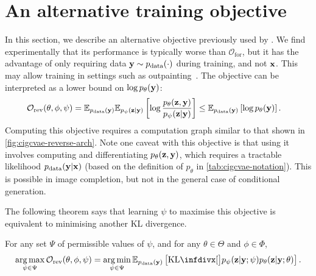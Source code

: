 \section{An alternative training objective}
\label{supp:cigcvae-ipa-r}
In this section, we describe an alternative objective previously used by
\citet{ma2018eddi}. We find experimentally that its performance is typically
worse than $\mathcal{O}_\mathrm{for}$, but it has the advantage of only
requiring data ${\mathbf{y}} \sim p_{\rm{data}} (\cdot)$ during training, and not ${\mathbf{x}}$.
This may allow training in settings such as
outpainting~\citep{sabini2018painting}. The objective can be interpreted as a
lower bound on $\log p_\theta({\mathbf{y}})$:
\begin{align} \label{eq:reverse-obj}
  \mathcal{O}_\text{rev}(\theta, \phi, \psi ) &= \mathbb{E}_{p_{\rm{data}} ({\mathbf{y}})}\mathbb{E}_{p_\psi({\mathbf{z}}|{\mathbf{y}})} \left[ \log\frac{p_\theta({\mathbf{z}},{\mathbf{y}})}{p_\psi({\mathbf{z}}|{\mathbf{y}})} \right] \leq \mathbb{E}_{p_{\rm{data}} ({\mathbf{y}})} \left[ \log p_\theta({\mathbf{y}}) \right].
\end{align}
Computing this objective requires a computation graph similar to that shown in
\cref{fig:cigcvae-reverse-arch}. Note one caveat with this objective is that using it
involves computing and differentiating $p_\theta({\mathbf{z}},{\mathbf{y}})$, which requires a
tractable likelihood $p_{\rm{data}} ({\mathbf{y}}|{\mathbf{x}})$ (based on the definition of
$p_\theta$ in \cref{tab:cigcvae-notation}). This is possible in image completion, but
not in the general case of conditional generation.

The following theorem says that learning $\psi $ to maximise this objective
is equivalent to minimising another KL divergence.
\begin{theorem} \label{theorem:reverse-kl} For any set $\Psi$ of
  permissible values of $\psi $, and for any $\theta\in\Theta$ and
  $\phi\in\Phi$,
  \begin{equation}
    \argmax_{\psi  \in \Psi} \mathcal{O}_\text{rev}(\theta, \phi, \psi ) = \argmin_{\psi  \in \Psi} \EX_{\pdata (\rvy)} \left[ \kl[\big] { p_\psi(\rvz|\rvy; \psi) }{ p_\theta(\rvz|\rvy; \theta) } \right].
  \end{equation}
\end{theorem}


